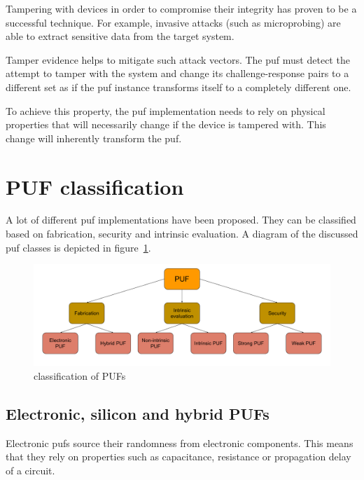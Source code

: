 Tampering with devices in order to compromise their integrity has proven to be a successful technique. For example, invasive attacks (such as microprobing) are able to extract sensitive data from the target system.\cite{Kommerling1999}

Tamper evidence helps to mitigate such attack vectors. The \gls{puf} must detect the attempt to tamper with the system and change its challenge-response pairs to a different set as if the \gls{puf} instance transforms itself to a completely different one.

To achieve this property, the \gls{puf} implementation needs to rely on physical properties that will necessarily change if the device is tampered with. This change will inherently transform the \gls{puf}.

\section{PUF classification}

A lot of different \gls{puf} implementations have been proposed. They can be classified based on fabrication, security and intrinsic evaluation\cite{Shital2017}\cite{McGrath2019}. A diagram of the discussed \gls{puf} classes is depicted in figure~\ref{fig:classification}.

\begin{figure}[ht!]
    \centering
    \captionsetup{justification=centering,margin=0.5cm}
    \includegraphics[width=\textwidth]{images/classification}
    \caption{classification of PUFs}
    \label{fig:classification}
\end{figure}

\subsection*{Electronic, silicon and hybrid PUFs}

Electronic \glspl{puf} source their randomness from electronic components. This means that they rely on properties such as capacitance, resistance or propagation delay of a circuit.

